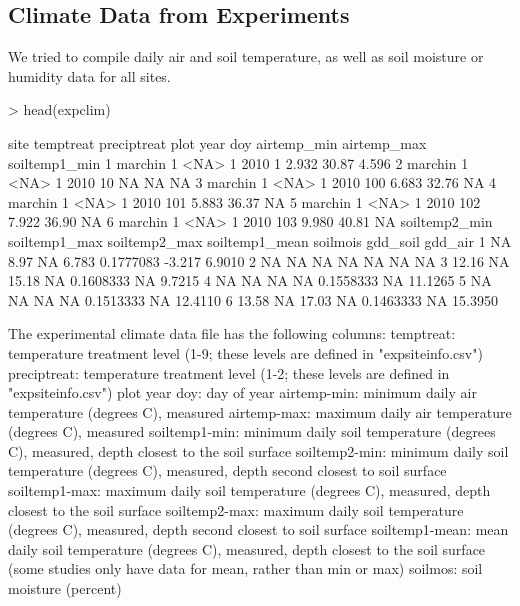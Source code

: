 \documentclass{article}
\begin{document}
\subsection{Climate Data from Experiments}
We tried to compile daily air and soil temperature, as well as soil moisture or humidity data for all sites.
\begin{Schunk}
\begin{Sinput}
> head(expclim)
\end{Sinput}
\begin{Soutput}
     site temptreat preciptreat plot year doy airtemp_min airtemp_max soiltemp1_min
1 marchin         1        <NA>    1 2010   1       2.932       30.87         4.596
2 marchin         1        <NA>    1 2010  10          NA          NA            NA
3 marchin         1        <NA>    1 2010 100       6.683       32.76            NA
4 marchin         1        <NA>    1 2010 101       5.883       36.37            NA
5 marchin         1        <NA>    1 2010 102       7.922       36.90            NA
6 marchin         1        <NA>    1 2010 103       9.980       40.81            NA
  soiltemp2_min soiltemp1_max soiltemp2_max soiltemp1_mean  soilmois gdd_soil gdd_air
1            NA          8.97            NA          6.783 0.1777083   -3.217  6.9010
2            NA            NA            NA             NA        NA       NA      NA
3         12.16            NA         15.18             NA 0.1608333       NA  9.7215
4            NA            NA            NA             NA 0.1558333       NA 11.1265
5            NA            NA            NA             NA 0.1513333       NA 12.4110
6         13.58            NA         17.03             NA 0.1463333       NA 15.3950
\end{Soutput}
\end{Schunk}
The experimental climate data file has the following columns:
temptreat: temperature treatment level (1-9; these levels are defined in "expsiteinfo.csv")
preciptreat: temperature treatment level (1-2; these levels are defined in "expsiteinfo.csv")
plot
year
doy: day of year
airtemp-min: minimum daily air temperature (degrees C), measured
airtemp-max: maximum daily air temperature (degrees C), measured
soiltemp1-min: minimum daily soil temperature (degrees C), measured, depth closest to the soil surface
soiltemp2-min: minimum daily soil temperature (degrees C), measured, depth second closest to soil surface
soiltemp1-max: maximum daily soil temperature (degrees C), measured, depth closest to the soil surface
soiltemp2-max: maximum daily soil temperature (degrees C), measured, depth second closest to soil surface
soiltemp1-mean: mean daily soil temperature (degrees C), measured, depth closest to the soil surface (some studies only have data for mean, rather than min or max)
soilmos: soil moisture (percent)
\end{document}
